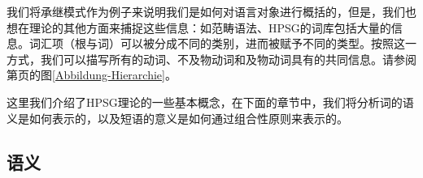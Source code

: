 我们将承继模式作为例子来说明我们是如何对语言对象进行概括的，但是，我们也想在理论的其他方面来捕捉这些信息：如范畴语法\indexcxgc、HPSG的词库包括大量的信息。词汇项（根与词）可以被分成不同的类别，进而被赋予不同的类型。按照这一方式，我们可以描写所有的动词、不及物动词和及物动词具有的共同信息。请参阅第\pageref{Abbildung-Hierarchie}页的图\ref{Abbildung-Hierarchie}。

这里我们介绍了HPSG理论的一些基本概念，在下面的章节中，我们将分析词的语义是如何表示的，以及短语的意义是如何通过组合性原则来表示的。

\subsection{语义}
\label{Abschnitt-HPSG-Semantik}

